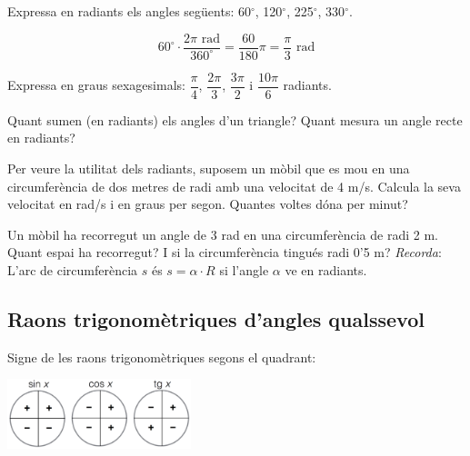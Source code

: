 \begin{mylist}
	\exer Expressa en radiants els angles següents: 60${}^\circ$, 120${}^\circ$, 225${}^\circ$, 330${}^\circ$.
	\begin{example}[*]
		\begin{equation*}
		60^\circ \cdot \frac{2 \pi \,\,\mathrm{rad}}{360^\circ} = \frac{60}{180}\pi = \frac{\pi}{3} \,\,\mathrm{rad}
		\end{equation*}
	\end{example}
	
	\exer 
	Expressa en graus sexagesimals: $\dfrac{\pi}{4}$, $\dfrac{2\pi}{3}$, $\dfrac{3\pi}{2}$ i $\dfrac{10\pi}{6}$ radiants.
	
	\exer 
	Quant sumen (en radiants) els angles d'un triangle? Quant mesura un
	angle recte en radiants?
	
	\exer
	Per veure la utilitat dels radiants, suposem un mòbil que es mou en
	una circumferència de dos metres de radi amb una velocitat de 4 m/s.
	Calcula la seva velocitat en rad/s i en graus per segon. Quantes
	voltes dóna per minut?
	
	\exer
	Un mòbil ha recorregut un angle de 3 rad en una circumferència de radi 2 m. Quant
	espai ha recorregut? I si la circumferència tingués radi 0'5 m? \emph{Recorda}:  
	L'arc de circumferència $s$ és $s=\alpha\cdot R$ si l'angle $\alpha$ ve en radiants.
	
\end{mylist}


\subsection{Raons trigonomètriques d'angles qualssevol}
\begin{theorybox}
	
	Signe de les raons trigonomètriques segons el quadrant:
	\begin{center}
		\includegraphics*[width=0.4\textwidth]{img-03/chap-trig-signesraons.png}
	\end{center}
\end{theorybox}

